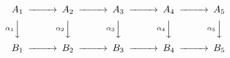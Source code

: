\[\begin{CD}
	{A_1} @>>> {A_2} @>>> {A_3} @>>> {A_4} @>>> {A_5} \\
	@V{\alpha_1}VV @V{\alpha_2}VV @V{\alpha_3}VV @V{\alpha_4}VV @V{\alpha_5}VV \\
	{B_1} @>>> {B_2} @>>> {B_3} @>>> {B_4} @>>> {B_5}
\end{CD}\]
